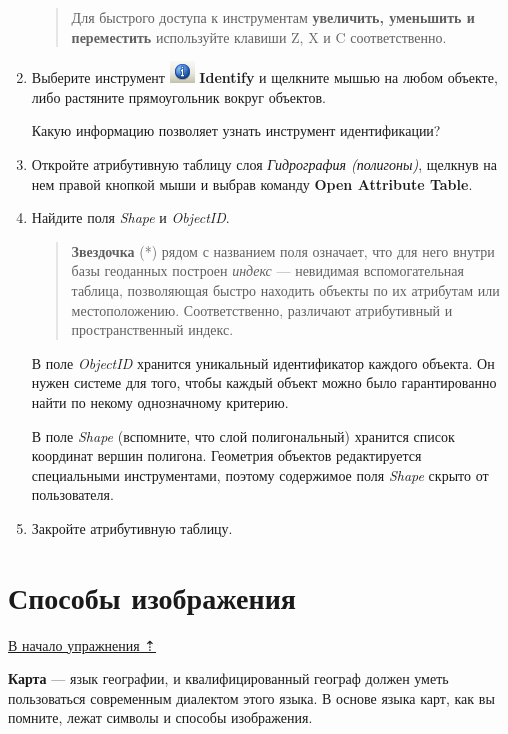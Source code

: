 \documentclass[]{book}
\theoremstyle{definition}
\theoremstyle{definition}
\theoremstyle{definition}
\theoremstyle{remark}
\begin{document}
\begin{enumerate}
  \begin{quote}
  Для быстрого доступа к инструментам \textbf{увеличить, уменьшить и
  переместить} используйте клавиши Z, X и C соответственно.
  \end{quote}
\item
  Выберите инструмент \includegraphics{images/Ex01/image14.png}
  \textbf{Identify} и щелкните мышью на любом объекте, либо растяните
  прямоугольник вокруг объектов.

  Какую информацию позволяет узнать инструмент идентификации?
\item
  Откройте атрибутивную таблицу слоя \emph{Гидрография (полигоны)},
  щелкнув на нем правой кнопкой мыши и выбрав команду \textbf{Open
  Attribute Table}.
\item
  Найдите поля \emph{Shape} и \emph{ObjectID}.

  \begin{quote}
  \textbf{Звездочка} (*) рядом с названием поля означает, что для него
  внутри базы геоданных построен \emph{индекс} --- невидимая
  вспомогательная таблица, позволяющая быстро находить объекты по их
  атрибутам или местоположению. Соответственно, различают атрибутивный и
  пространственный индекс.
  \end{quote}

  В поле \emph{ObjectID} хранится уникальный идентификатор каждого
  объекта. Он нужен системе для того, чтобы каждый объект можно было
  гарантированно найти по некому однозначному критерию.

  В поле \emph{Shape} (вспомните, что слой полигональный) хранится
  список координат вершин полигона. Геометрия объектов редактируется
  специальными инструментами, поэтому содержимое поля \emph{Shape}
  скрыто от пользователя.
\item
  Закройте атрибутивную таблицу.
\end{enumerate}

\hypertarget{map-design-quaternary-representations}{%
\section{Способы
изображения}\label{map-design-quaternary-representations}}

\protect\hyperlink{map-design-quaternary}{В начало упражнения ⇡}

\textbf{Карта} --- язык географии, и квалифицированный географ должен
уметь пользоваться современным диалектом этого языка. В основе языка
карт, как вы помните, лежат символы и способы изображения.
\end{document}
